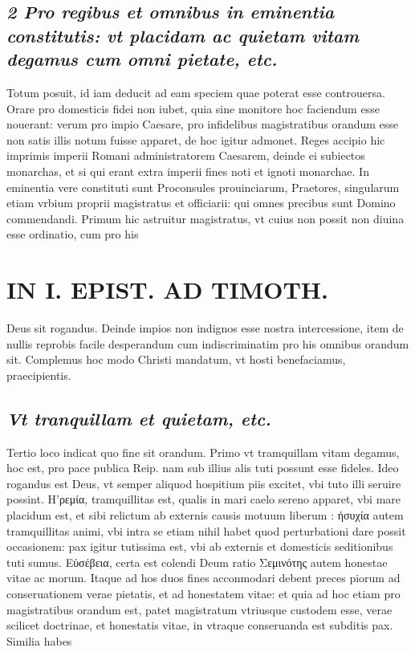 \documentclass{article}
\begin{document}
\begin{pages}
\subsection*{\textit{2 Pro regibus et omnibus in eminentia constitutis: vt placidam ac quietam vitam degamus cum omni pietate, etc. }}\pstart Totum posuit, id iam deducit ad eam speciem quae poterat esse controuersa. Orare pro domesticis fidei non iubet, quia sine monitore hoc faciendum esse nouerant: verum pro impio Caesare, pro infidelibus magistratibus orandum esse non satis illis notum fuisse apparet, de hoc igitur admonet. Reges accipio hic imprimis imperii Romani administratorem Caesarem, deinde ei subiectos monarchas, et si qui erant extra imperii fines noti et ignoti monarchae. In eminentia vere constituti sunt Proconsules prouinciarum, Praetores, singularum etiam vrbium proprii magistratus et officiarii: qui omnes precibus sunt Domino commendandi. Primum hic astruitur magistratus, vt cuius non possit non diuina esse ordinatio, cum pro his  \pend
\section*{IN I. EPIST. AD TIMOTH. }
\marginpar{[ p.47 ]}\pstart Deus sit rogandus. Deinde impios non indignos esse nostra intercessione, item de nullis reprobis facile desperandum cum indiscriminatim pro his omnibus orandum sit. Complemus hoc modo Christi mandatum, vt hosti benefaciamus, praecipientis.  \pend
{}
{}
\subsection*{\textit{Vt tranquillam et quietam, etc. }}\pstart Tertio loco indicat quo fine sit orandum. Primo vt tramquillam vitam degamus, hoc est, pro pace publica Reip. nam sub illius alis tuti possunt esse fideles. Ideo rogandus est Deus, vt semper aliquod hospitium piis excitet, vbi tuto illi seruire possint. H'ρεμία, tramquillitas est, qualis in mari caelo sereno apparet, vbi mare placidum est, et sibi relictum ab externis causis motuum liberum : ἠσυχία autem tramquillitas animi, vbi intra se etiam nihil habet quod perturbationi dare possit occasionem: pax igitur tutissima est, vbi ab externis et domesticis seditionibus tuti sumus. Εὐσέβεια, certa est colendi Deum ratio Σεμινότης autem honestae vitae ac morum. Itaque ad hos duos fines acconmodari debent preces piorum ad conseruationem verae pietatis, et ad honestatem vitae: et quia ad hoc etiam pro magistratibus orandum est, patet magistratum vtriusque custodem esse, verae scilicet doctrinae, et honestatis vitae, in vtraque conseruanda est subditis pax. Similia habes  \pend

\end{pages}
\end{document}
